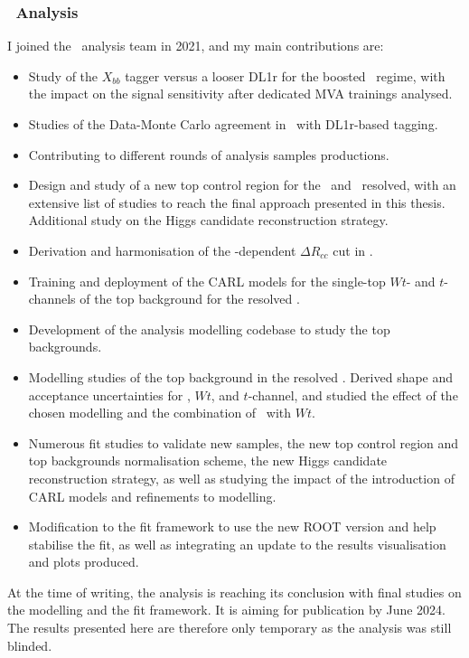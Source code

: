 \subsubsection{\boldvhbc\ Analysis}
I joined the \vhbc\ analysis team in 2021, and my main contributions are:
\begin{itemize}
    \item Study of the $X_{bb}$ tagger versus a looser DL1r for the boosted \vhb\ regime, with the impact on the signal sensitivity after dedicated MVA trainings analysed.
    \item Studies of the Data-Monte Carlo agreement in \vhc\ with DL1r-based tagging. 
    \item Contributing to different rounds of analysis samples productions.
    \item Design and study of a new top control region for the \vhc\ and \vhb\ resolved, with an extensive list of studies to reach the final approach presented in this thesis. Additional study on the Higgs candidate reconstruction strategy.
    \item Derivation and harmonisation of the \ptv-dependent $\Delta R_{cc}$ cut in \vhc.
    \item Training and deployment of the CARL models for the single-top $Wt$- and $t$-channels of the top background for the resolved \vhb.
    \item Development of the analysis modelling codebase to study the top backgrounds. 
    \item Modelling studies of the top background in the resolved \vhb. Derived shape and acceptance uncertainties for \ttb, $Wt$, and $t$-channel, and studied the effect of the chosen modelling and the combination of \ttb\ with $Wt$. 
    \item Numerous fit studies to validate new samples, the new top control region and top backgrounds normalisation scheme, the new Higgs candidate reconstruction strategy, as well as studying the impact of the introduction of CARL models and refinements to modelling. 
    \item Modification to the fit framework to use the new ROOT version and help stabilise the fit, as well as integrating an update to the results visualisation and plots produced.
\end{itemize}
At the time of writing, the analysis is reaching its conclusion with final studies on the modelling and the fit framework. It is aiming for publication by June 2024. The results presented here are therefore only temporary as the analysis was still blinded.